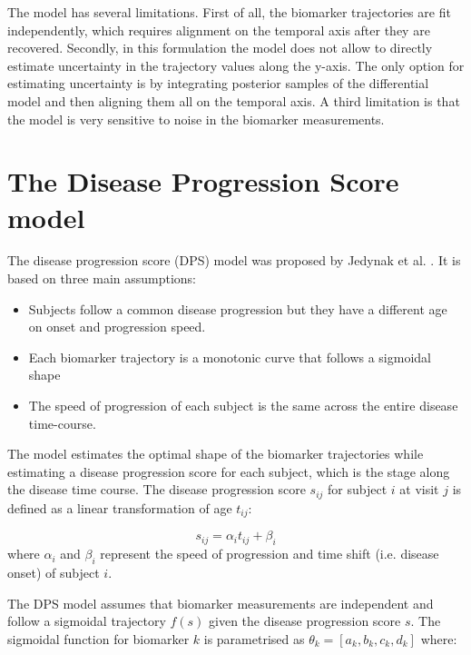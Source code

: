 The model has several limitations. First of all, the biomarker trajectories are fit independently, which requires alignment on the temporal axis after they are recovered. Secondly, in this formulation the model does not allow to directly estimate uncertainty in the trajectory values along the y-axis. The only option for estimating uncertainty is by integrating posterior samples of the differential model and then aligning them all on the temporal axis. A third limitation is that the model is very sensitive to noise in the biomarker measurements. 


\section{The Disease Progression Score model}
\label{sec:dps}

The disease progression score (DPS) model was proposed by Jedynak et al. \cite{jedynak2012computational}. It is based on three main assumptions:
\begin{itemize}
 \item Subjects follow a common disease progression but they have a different age on onset and progression speed.
 \item Each biomarker trajectory is a monotonic curve that follows a sigmoidal shape
 \item The speed of progression of each subject is the same across the entire disease time-course.
\end{itemize}

The model estimates the optimal shape of the biomarker trajectories while estimating a disease progression score for each subject, which is the stage along the disease time course. The disease progression score $s_{ij}$ for subject $i$ at visit $j$ is defined as a linear transformation of age $t_{ij}$:

\begin{equation}
\label{eq:dps}
 s_{ij} = \alpha_i t_{ij} + \beta_i
\end{equation}
where $\alpha_i$ and $\beta_i$ represent the speed of progression and time shift (i.e. disease onset) of subject $i$. 

The DPS model assumes that biomarker measurements are independent and follow a sigmoidal trajectory $f(s)$ given the disease progression score $s$. The sigmoidal function for biomarker $k$ is parametrised as $\theta_k = [a_k,b_k,c_k,d_k]$ where:

